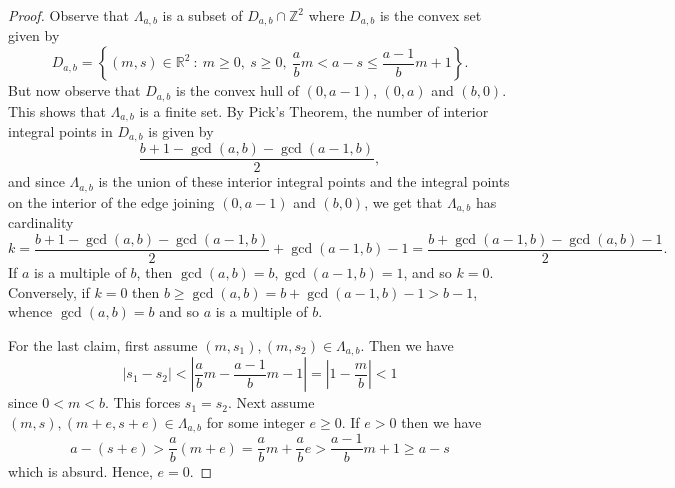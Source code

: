 \documentclass{article}
\newcommand{\RR}{\mathbb{R}}
\newcommand{\ZZ}{\mathbb{Z}}
\begin{document}
\begin{proof}
    Observe that $\Lambda_{a,b}$ is a subset of $D_{a,b}\cap \ZZ^2$ where $D_{a,b}$ is the convex set given by
    \[
    D_{a,b}=\left\{(m,s)\in\RR^2 \ : \ m\geq 0, \ s\geq 0, \ \frac{a}{b}m<a-s\leq \frac{a-1}{b}m+1\right\}.
    \]
    But now observe that $D_{a,b}$ is the convex hull of $(0,a-1)$, $(0,a)$ and $(b,0)$. This shows that $\Lambda_{a,b}$ is a finite set. By Pick's Theorem, the number of interior integral points in $D_{a,b}$ is given by
    \[
     \frac{b+1-\gcd(a,b)-\gcd(a-1,b)}{2},
    \]
    and since $\Lambda_{a,b}$ is the union of these interior integral points and the integral points on the interior of the edge joining $(0,a-1)$ and $(b,0)$, we get that $\Lambda_{a,b}$ has cardinality
    \[
    k=\frac{b+1-\gcd(a,b)-\gcd(a-1,b)}{2}+\gcd(a-1,b)-1 = \frac{b+\gcd(a-1,b)-\gcd(a,b)-1}{2}.
    \]
    If $a$ is a multiple of $b$, then $\gcd(a,b)=b, \gcd(a-1,b)=1$, and so $k=0$. Conversely, if $k=0$ then $b\geq \gcd(a,b) = b+\gcd(a-1,b) -1>b-1$, whence $\gcd(a,b)= b$ and so $a$ is a multiple of $b$.
    
    For the last claim, first assume $(m,s_1),(m,s_2)\in \Lambda_{a,b}$. Then we have 
    \[
    |s_1-s_2| < \left\vert\frac{a}{b}m-\frac{a-1}{b}m-1\right\vert=\left\vert1-\frac{m}{b}\right\vert < 1
    \]
    since $0<m<b$. This forces $s_1=s_2$. Next assume $(m,s),(m+e,s+e)\in\Lambda_{a,b}$ for some integer $e \geq 0$. If $e>0$ then we have 
    \[
    a-(s+e)>\frac{a}{b}(m+e)=\frac{a}{b}m+\frac{a}{b}e > \frac{a-1}{b}m+1 \geq a - s
    \]
    which is absurd. Hence, $e=0$.
\end{proof}
\end{document}
